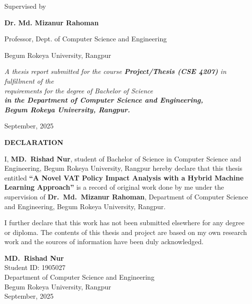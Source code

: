 \begin{titlepage}
        Supervised by\par
        \textbf{Dr. Md. Mizanur Rahoman}\par
        Professor, Dept. of Computer Science and Engineering\par
        Begum Rokeya University, Rangpur\par

        \vspace{1cm}

\textit{A thesis report submitted for the course \textbf{Project/Thesis (CSE 4207)} in fulfillment of the\\
requirements for the degree of Bachelor of Science\\
\textbf{in the Department of Computer Science and Engineering,\\ Begum Rokeya University, Rangpur.}}

\vspace{1cm}
        { \large
            September, 2025
        }
\end{titlepage}
\vspace{10mm}
\newpage
\thispagestyle{empty}
\vspace*{4cm}

\begin{center}
    {\Large\bfseries DECLARATION}
\end{center}

\vspace{1cm}

I, \textbf{MD.\ Rishad Nur}, student of Bachelor of Science in Computer Science and Engineering, Begum Rokeya University, Rangpur hereby declare that this thesis entitled \textbf{``A Novel VAT Policy Impact Analysis with a Hybrid Machine Learning Approach''} is a record of original work done by me under the supervision of \textbf{Dr.\ Md.\ Mizanur Rahoman}, Department of Computer Science and Engineering, Begum Rokeya University, Rangpur.

\vspace{1cm}

I further declare that this work has not been submitted elsewhere for any degree or diploma. The contents of this thesis and project are based on my own research work and the sources of information have been duly acknowledged.

\vspace{3cm}

\begin{flushright}
    \textbf{MD.\ Rishad Nur}\\
    Student ID: 1905027\\
    Department of Computer Science and Engineering\\
    Begum Rokeya University, Rangpur\\
    September, 2025
\end{flushright}

